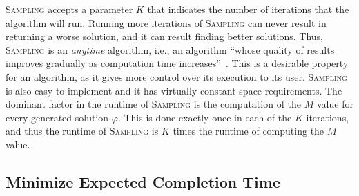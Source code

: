 \documentclass[letterpaper]{article} %
\newcommand{\tuple}[1]{\langle#1\rangle}
\newcommand{\samd}{\ac{SAMD}\xspace}
\newcommand{\sampling}{\textsc{Sampling}\xspace}
\newcommand{\expectation}{\textsc{Expectation}\xspace}
\begin{document}
\sampling accepts a parameter $K$ that indicates the number of iterations that the algorithm will run. Running more iterations of \sampling can never result in returning a worse solution, and it can result finding better solutions. Thus, \sampling is an \emph{anytime} algorithm, i.e., an algorithm
``whose quality of results improves gradually as computation time increases''~\cite{zilberstein1996using}. This is a desirable property for an algorithm, as it gives more control over its execution to its user.
 \sampling is also easy to implement and it has virtually constant space requirements. The dominant factor in the runtime of \sampling is the computation of the $M$ value for every generated solution $\varphi$. This is done exactly once in each of the $K$ iterations, and thus the runtime of \sampling is $K$ times the runtime of computing the $M$ value.







\subsection{Minimize Expected Completion Time}\label{sec:expect}

\end{document}
